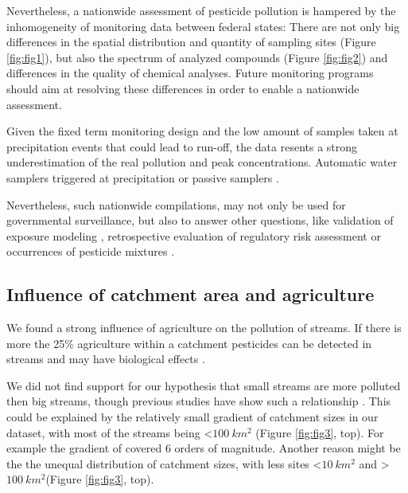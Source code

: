 \documentclass[journal=esthag,manuscript=article]{achemso}
\begin{document}
Nevertheless, a nationwide assessment of pesticide pollution is hampered by the inhomogeneity of monitoring data between federal states:
There are not only big differences in the spatial distribution and quantity of sampling sites (Figure \ref{fig:fig1}), but also the spectrum of analyzed compounds (Figure \ref{fig:fig2}) and differences in the quality of chemical analyses.
Future monitoring programs should aim at resolving these differences in order to enable a nationwide assessment. 

Given the fixed term monitoring design  and the low amount of samples taken at precipitation events that could lead to run-off, the data resents a strong underestimation of the real pollution and peak concentrations.
Automatic water samplers triggered at precipitation or passive samplers .

Nevertheless, such nationwide compilations, may not only be used for governmental surveillance, but also to answer other questions, like validation of exposure modeling \cite{knabel_fungicide_2014}, retrospective evaluation of regulatory risk assessment \citep{knauer_pesticides_2016,stehle_pesticide_2015}or occurrences of pesticide mixtures \cite{schreiner_pesticide_2016}.


\subsection{Influence of catchment area and agriculture}
We found a strong influence of agriculture on the pollution of streams.
If there is more the 25\% agriculture within a catchment pesticides can be detected in streams and may have biological effects .

We did not find support for our hypothesis that small streams are more polluted then big streams, though previous studies have show such a relationship \citep{schulz_field_2004,stehle_pesticide_2015}.
This could be explained by the relatively small gradient of catchment sizes in our dataset, with most of the streams being \textless $100~km^2$ (Figure \ref{fig:fig3}, top).
For example the gradient of \citet{schulz_field_2004} covered 6 orders of magnitude.
Another reason might be the the unequal distribution of catchment sizes, with less sites \textless $10~km^2$ and \textgreater $100~km^2$(Figure \ref{fig:fig3}, top).
\end{document}
